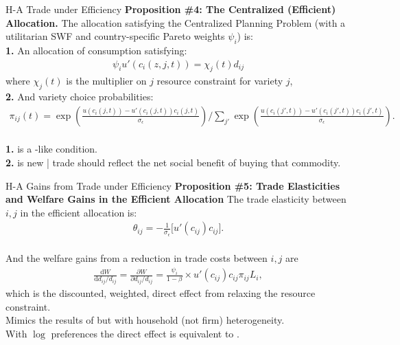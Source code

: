 \documentclass[9pt,pdftex,aspectratio=1610]{beamer}
\theoremstyle{definition}
\begin{document}
\begin{frame}[t]{H-A Trade under Efficiency}
\smallskip
\textbf{Proposition \#4: The Centralized (Efficient) Allocation.} The allocation satisfying the Centralized Planning Problem (with a utilitarian SWF and country-specific Pareto weights $\psi_i$) is:\\
\bigskip
\textbf{1.} An allocation of consumption satisfying:
\begin{align}
\psi_{i} u'(c_{i}(z,j,t) ) = \chi_{j}(t) d_{ij} \nonumber
\end{align}
where $\chi_{j}(t)$ is the multiplier on $j$ resource constraint for variety $j$,\\
\bigskip
\medskip
\textbf{2.} And variety choice probabilities:
\begin{align}
\displaystyle \pi_{ij}(t) =\exp \left( \frac{u(c_{i}(j,t)) - u'(c_{i}(j,t))c_{i}(j,t)}{\sigma_{\epsilon}}\right) \bigg / \sum_{j'}\exp \left( \frac{u(c_{i}(j',t)) - u'(c_{i}(j',t))c_{i}(j',t)}{\sigma_{\epsilon}} \right). \nonumber
\end{align}\\
\bigskip
\medskip
\textbf{1.} is a \citet{backus1993}-like condition. \\
\smallskip
\textbf{2.} is new | trade should reflect the net social benefit of buying that commodity.
\end{frame}

\begin{frame}[t]{H-A Gains from Trade under Efficiency}
\smallskip
\textbf{Proposition \#5: Trade Elasticities and Welfare Gains in the Efficient Allocation} The trade elasticity between $i,j$ in the efficient allocation is:
\begin{align}
\theta_{ij} =  -\frac{1}{\sigma_{\epsilon}} \bigg [ u'(c_{ij}) c_{ij} \bigg]. \nonumber
\end{align}\\
\bigskip
And the welfare gains from a reduction in trade costs between $i,j$ are
\begin{align}
\frac{\mathrm{d} W}{\mathrm{d} d_{ij} / d_{ij}} = \frac{\partial W}{\partial d_{ij} / d_{ij}} = \frac{\psi_{i}}{1-\beta} \times u'(c_{ij}) c_{ij} \pi_{ij} L_i, \nonumber
\end{align}
which is the discounted, weighted, direct effect from relaxing the resource constraint.\\
\bigskip
\medskip
Mimics the results of \citet{AtkesonBurstein2010} but with household (not firm) heterogeneity.\\
\medskip
With $\log$ preferences the direct effect is equivalent to \citet{arkolakis2012new}.\\
\bigskip

\end{frame}
\end{document}
